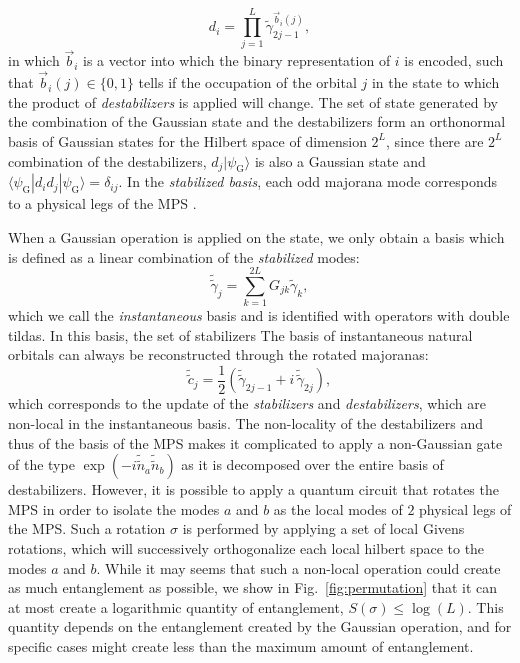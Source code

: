 \documentclass[a4paper, twocolumn, superscriptaddress, longbibliography]{revtex4-2}
\begin{document}
	\begin{equation}
	d^{}_i = \prod_{j=1}^{L}\tilde{\gamma}_{2j-1}^{\vec{b}_{i}(j)},
	\end{equation}
	in which $\vec{b}_i$ is a vector into which the binary representation of $i$ is encoded, such that $\vec{b}_{i}(j) \in \{0,1\}$ tells if the occupation of the orbital $j$ in the state to which the product of \emph{destabilizers} is applied will change. The set of state generated by the combination of the Gaussian state and the destabilizers form an orthonormal basis of Gaussian states for the Hilbert space of dimension $2^{L}$, since there are $2^L$ combination of the destabilizers, $d_j |\psi_{\mathrm{G}}\rangle$ is also a Gaussian state and $\langle \psi_{\mathrm{G}}^{}|d_i d_j |\psi_{\mathrm{G}}\rangle = \delta_{ij}$. In the \emph{stabilized basis}, each odd majorana mode corresponds to a physical legs of the MPS .

	When a Gaussian operation is applied on the state, we only obtain a basis which is defined as a linear combination of the \emph{stabilized} modes:
	\begin{equation}
		\tilde{\tilde{\gamma}}_j = \sum_{k=1}^{2L} G_{jk}\tilde{\gamma}_{k},
	\end{equation}
	which we call the \emph{instantaneous} basis and is identified with operators with double tildas. In this basis, the set of stabilizers
	The basis of instantaneous natural orbitals can always be reconstructed through the rotated majoranas:
	\begin{equation}
		\tilde{\tilde{c}}_{j}^{} = \frac{1}{2}\left(\tilde{\tilde{\gamma}}_{2j-1} + i\,\tilde{\tilde{\gamma}}_{2j}\right),
	\end{equation}
	which corresponds to the update of the \emph{stabilizers} and \emph{destabilizers}, which are non-local in the instantaneous basis. The non-locality of the destabilizers and thus of the basis of the MPS makes it complicated to apply a non-Gaussian gate of the type $\exp(-i\tilde{\tilde{n}}_a\tilde{\tilde{n}}_b)$ as it is decomposed over the entire basis of destabilizers. However, it is possible to apply a quantum circuit that rotates the MPS in order to isolate the modes $a$ and $b$ as the local modes of $2$ physical legs of the MPS. Such a rotation $\sigma$ is performed by applying a set of local Givens rotations, which will successively orthogonalize each local hilbert space to the modes $a$ and $b$. While it may seems that such a non-local operation could create as much entanglement as possible, we show in Fig.~\ref{fig:permutation} that it can at most create a logarithmic quantity of entanglement, $S(\sigma)\leq \log(L)$. This quantity depends on the entanglement created by the Gaussian operation, and for specific cases might create less than the maximum amount of entanglement. 
\end{document}

